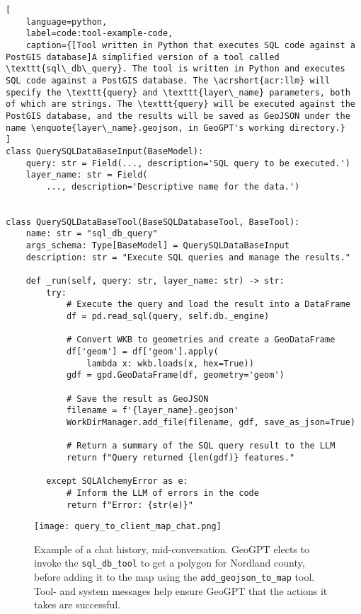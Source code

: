 \begin{lstlisting}[
    language=python,
    label=code:tool-example-code,
    caption={[Tool written in Python that executes SQL code against a PostGIS database]A simplified version of a tool called \texttt{sql\_db\_query}. The tool is written in Python and executes SQL code against a PostGIS database. The \acrshort{acr:llm} will specify the \texttt{query} and \texttt{layer\_name} parameters, both of which are strings. The \texttt{query} will be executed against the PostGIS database, and the results will be saved as GeoJSON under the name \enquote{layer\_name}.geojson, in GeoGPT's working directory.} 
]
class QuerySQLDataBaseInput(BaseModel):
    query: str = Field(..., description='SQL query to be executed.')
    layer_name: str = Field(
        ..., description='Descriptive name for the data.')


class QuerySQLDataBaseTool(BaseSQLDatabaseTool, BaseTool):
    name: str = "sql_db_query"
    args_schema: Type[BaseModel] = QuerySQLDataBaseInput
    description: str = "Execute SQL queries and manage the results."

    def _run(self, query: str, layer_name: str) -> str:
        try:
            # Execute the query and load the result into a DataFrame
            df = pd.read_sql(query, self.db._engine)

            # Convert WKB to geometries and create a GeoDataFrame
            df['geom'] = df['geom'].apply(
                lambda x: wkb.loads(x, hex=True))
            gdf = gpd.GeoDataFrame(df, geometry='geom')

            # Save the result as GeoJSON
            filename = f'{layer_name}.geojson'
            WorkDirManager.add_file(filename, gdf, save_as_json=True)

            # Return a summary of the SQL query result to the LLM
            return f"Query returned {len(gdf)} features."

        except SQLAlchemyError as e:
            # Inform the LLM of errors in the code
            return f"Error: {str(e)}"
\end{lstlisting}

\begin{figure}
    \centering
    \texttt{[image: query\_to\_client\_map\_chat.png]}
    \caption[Example of a chat history]{Example of a chat history, mid-conversation. GeoGPT elects to invoke the \texttt{sql\_db\_tool} to get a polygon for Nordland county, before adding it to the map using the \texttt{add\_geojson\_to\_map} tool. Tool- and system messages help ensure GeoGPT that the actions it takes are successful.}
    \label{fig:chat-trace-example}
\end{figure}


